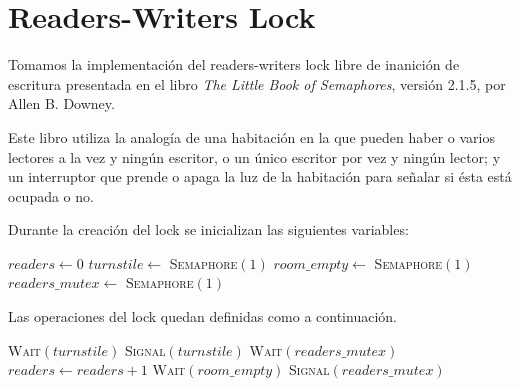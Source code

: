 \documentclass[a4paper,10pt,twoside]{article}
\newenvironment{pseudo}[1][]{%
    \vspace{0.5em}%
    \begin{algorithmic}%
}
{%
    \end{algorithmic}%
    \vspace{0.5em}%
}
\newcommand{\Fn}[2]{\textsc{#1}$(#2)$}
\begin{document}
\newpage




\tableofcontents

\newpage




\section{Readers-Writers Lock}

Tomamos la implementación del readers-writers lock libre de inanición de escritura presentada en el libro \textit{The Little Book of Semaphores}, versión 2.1.5, por Allen B. Downey.

Este libro utiliza la analogía de una habitación en la que pueden haber o varios lectores a la vez y ningún escritor, o un único escritor por vez y ningún lector; y un interruptor que prende o apaga la luz de la habitación para señalar si ésta está ocupada o no.

Durante la creación del lock se inicializan las siguientes variables:

\begin{pseudo}
    \State $readers \leftarrow 0$ 
    \State $turnstile \leftarrow$ \Fn{Semaphore}{1} 
    \State $room\_empty \leftarrow$ \Fn{Semaphore}{1} 
    \State $readers\_mutex \leftarrow$ \Fn{Semaphore}{1} 
\end{pseudo}

Las operaciones del lock quedan definidas como a continuación.

\begin{pseudo}
        \State \Fn{Wait}{turnstile} 
        \State \Fn{Signal}{turnstile}
        \State
        \State \Fn{Wait}{readers\_mutex}
        \State $readers \leftarrow readers + 1$ 
         
            \State \Fn{Wait}{room\_empty} 
        \EndIf
        \State \Fn{Signal}{readers\_mutex}
    \EndProcedure
\end{pseudo}
\end{document}
